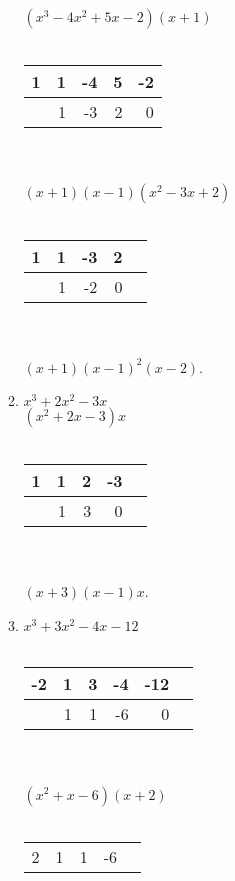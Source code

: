 \begin{enumerate}
\begin{enumerate}
			\\
			\\
			$(x^3 - 4x^2 + 5x - 2)(x + 1)$
	 		\\
	 		\\
			\begin{tabular}{ l | r r r r }
			   1 & 1 & -4 & 5 & -2 \\
				\hline
			    & 1 & -3 & 2 & 0 \\
			\end{tabular}
			\\
			\\
			$(x + 1)(x - 1)(x^2 - 3x + 2)$
			\\
			\\
			\begin{tabular}{ l | r r r r }
			   1 & 1 & -3 & 2 \\
				\hline
			    & 1 & -2 & 0  \\
			\end{tabular}
			\\
			\\
			$(x + 1)(x - 1)^2(x - 2)$.
			\\
		\item %
			$x^3 + 2x^2 - 3x$
			\\
			$(x^2 + 2x - 3)x$
			\\
			\\
			\begin{tabular}{ l | r r r r }
			  1 & 1 & 2 & -3 \\
				\hline
			    & 1 & 3 & 0 \\
			\end{tabular}
			\\
			\\
			$(x + 3)(x - 1)x$.
			\\
			\item %
			$x^3+3x^2-4x-12$
			\\
			\\
			\begin{tabular}{ l | r r r r r }
			  -2 & 1 & 3 & -4 & -12 \\
				\hline
			    & 1 & 1 & -6 & 0 \\
			\end{tabular}
			\\
			\\
			$(x^2+x-6)(x+2)$
			\\
			\\
			\begin{tabular}{ l | r r r r }
			  2 & 1 & 1 & -6 \\

\end{tabular}
\end{enumerate}
\end{enumerate}
